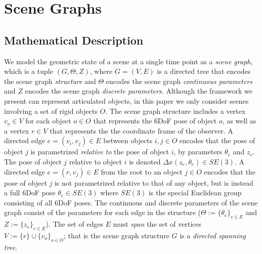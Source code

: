 \chapter{Scene Graphs}

\section{Mathematical Description}

We model the geometric state of a scene at a single time point as a \emph{scene graph}, which is a tuple $(G, \Theta, Z)$, where $G = (V, E)$ is a directed tree that encodes the scene graph \emph{structure} and $\Theta$ encodes the scene graph \emph{continuous parameters} and $Z$ encodes the scene graph \emph{discrete parameters}.
Although the framework we present can represent articulated objects, in this paper we only consider scenes involving a set of rigid objects $O$.
The scene graph structure includes a vertex $v_o \in V$ for each object $o \in O$ that represents the 6DoF pose of object $o$, as well as a vertex $r \in V$ that represents the the coordinate frame of the observer.
A directed edge $e = (v_i, v_j) \in E$ between objects $i, j \in O$ encodes that the pose of object $j$ is parametrized \emph{relative to} the pose of object $i$, by parameters $\theta_e$ and $z_e$.
The pose of object $j$ relative to object $i$ is denoted $\Delta x(z_e, \theta_e) \in SE(3)$.
A directed edge $e = (r, v_j) \in E$ from the root to an object $j \in O$ encodes that the pose of object $j$ is not parametrized relative to that of any object, but is instead a full 6DoF pose $\theta_e \in SE(3)$ where $SE(3)$ is the special Euclidean group consisting of all 6DoF poses.
The continuous and discrete parameters of the scene graph consist of the parameters for each edge in the structure ($\Theta := \{\theta_e\}_{e \in E}$ and $Z := \{z_e\}_{e \in E}$).
The set of edges $E$ must \emph{span} the set of vertices $V := \{r\} \cup \{v_o\}_{o \in O}$; that is the scene graph structure $G$ is a \emph{directed spanning tree}.

